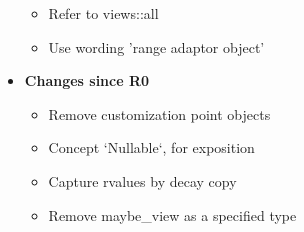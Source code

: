 \documentclass[a4paper,10pt,oneside,openany,final,article]{memoir}
\begin{document}
\begin{itemize}
\begin{itemize}
  \item Refer to views::all
  \item Use wording 'range adaptor object'
  \end{itemize}
\item \textbf{Changes since R0}
  \begin{itemize}
  \item Remove customization point objects
  \item Concept `Nullable`, for exposition
  \item Capture rvalues by decay copy
  \item Remove maybe\_view as a specified type
  \end{itemize}
\end{itemize}

\renewcommand{\bibname}{References}



\nocite{viewmayb27:online}
\end{document}
